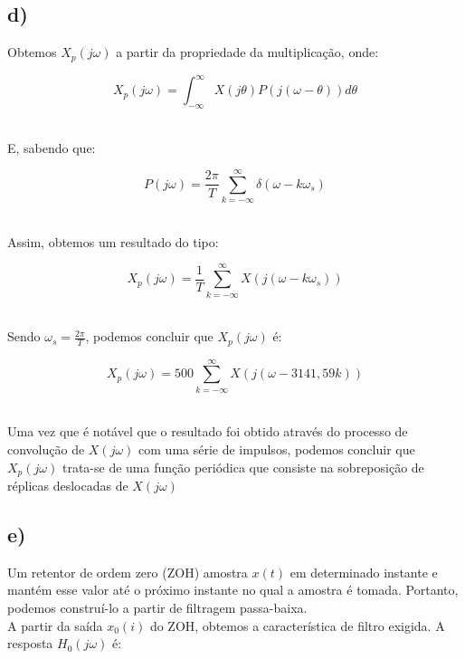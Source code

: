 \documentclass[a4paper,12pt,oneside,openany,table,xcdraw]{article}
\begin{document}
\subsection{d)}
Obtemos $X_p(j\omega)$ a partir da propriedade da multiplicação, onde:
\begin{center}
    $$X_p(j\omega) = \int_{-\infty}^{\infty} X(j\theta)P(j(\omega - \theta)) d\theta$$\\
\end{center}
E, sabendo que:
\begin{center}
    \vspace{0.25cm}
    $$P(j\omega) = \frac{2\pi}{T} \sum_{k=- \infty}^{\infty} \delta(\omega - k\omega_s)$$\\
    \vspace{0.25cm}
\end{center}
Assim, obtemos um resultado do tipo:
\begin{center}
    \vspace{0.25cm}
    $$X_p(j\omega) = \frac{1}{T} \sum_{k=- \infty}^{\infty} X(j(\omega - k\omega_s))$$\\
    \vspace{0.25cm}  
\end{center}

Sendo $\omega_s = \frac{2\pi}{T}$, podemos concluir que $X_p(j\omega)$ é:

\begin{center}
    \vspace{0.25cm}
    $$X_p(j\omega) = 500 \sum_{k=- \infty}^{\infty} X(j(\omega - 3141,59k))$$\\
    \vspace{0.25cm} 
\end{center}

Uma vez que é notável que o resultado foi obtido através do processo de convolução de $X(j\omega)$ com uma série de impulsos, podemos concluir que $X_p(j\omega)$ trata-se de uma função periódica que consiste na sobreposição de réplicas deslocadas de $X(j\omega)$

\subsection{e)}

 Um retentor de ordem zero (ZOH) amostra $x(t)$ em determinado instante e mantém esse valor até o próximo instante no qual a amostra é tomada. Portanto, podemos construí-lo a partir de filtragem passa-baixa.\\
 A partir da saída $x_0(i)$ do ZOH, obtemos a característica de filtro exigida. A resposta $H_0(j\omega)$ é:
 
\end{document}
